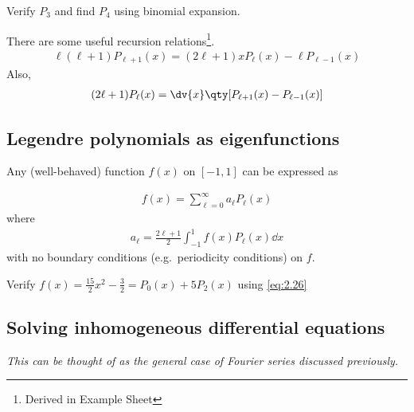 \begin{exercise}
    Verify $P_3$ and find $P_4$ using binomial expansion.
\end{exercise} 
There are some useful recursion relations\footnote{Derived in Example Sheet}.
\begin{align*}
    \ell(\ell + 1) P_{\ell + 1}(x) = (2 \ell + 1) x P_\ell(x) - \ell P_{\ell - 1}(x)
\end{align*}
Also,
\begin{align*}
    (2\ell + 1)P_\ell(x) = \dv{x} \qty[ P_{\ell + 1}(x) - P_{\ell - 1}(x) ]
\end{align*}

\subsection{Legendre polynomials as eigenfunctions}
Any (well-behaved) function $f(x)$ on $[-1,1]$ can be expressed as
\addtocounter{equation}{1}
\begin{align} \label{eq:2.25}
    f(x) = \sum_{\ell = 0}^\infty a_\ell P_\ell(x)
\end{align}
where
\begin{align} \label{eq:2.26}
    a_\ell = \frac{2\ell + 1}{2} \int_{-1}^1 f(x) P_\ell(x) \dd{x}
\end{align}
with no boundary conditions (e.g.\ periodicity conditions) on $f$.

\begin{exercise}
    Verify $f(x) = \frac{15}{2} x^2 - \frac{3}{2} = P_0(x) + 5 P_2(x)$ using \cref{eq:2.26}
\end{exercise} 

\subsection{Solving inhomogeneous differential equations}
\textit{This can be thought of as the general case of Fourier series discussed previously.}

